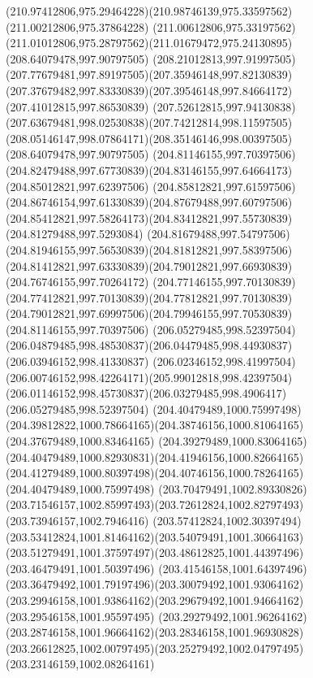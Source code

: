 {{  \curveto(210.97412806,975.29464228)(210.98746139,975.33597562)(211.00212806,975.37864228)
  \curveto(211.00612806,975.33197562)(211.01012806,975.28797562)(211.01679472,975.24130895)
  \moveto(208.64079478,997.90797505)
  \curveto(208.21012813,997.91997505)(207.77679481,997.89197505)(207.35946148,997.82130839)
  \curveto(207.37679482,997.83330839)(207.39546148,997.84664172)(207.41012815,997.86530839)
  \curveto(207.52612815,997.94130838)(207.63679481,998.02530838)(207.74212814,998.11597505)
  \curveto(208.05146147,998.07864171)(208.35146146,998.00397505)(208.64079478,997.90797505)
  \moveto(204.81146155,997.70397506)
  \curveto(204.82479488,997.67730839)(204.83146155,997.64664173)(204.85012821,997.62397506)
  \curveto(204.85812821,997.61597506)(204.86746154,997.61330839)(204.87679488,997.60797506)
  \curveto(204.85412821,997.58264173)(204.83412821,997.55730839)(204.81279488,997.5293084)
  \curveto(204.81679488,997.54797506)(204.81946155,997.56530839)(204.81812821,997.58397506)
  \curveto(204.81412821,997.63330839)(204.79012821,997.66930839)(204.76746155,997.70264172)
  \curveto(204.77146155,997.70130839)(204.77412821,997.70130839)(204.77812821,997.70130839)
  \curveto(204.79012821,997.69997506)(204.79946155,997.70530839)(204.81146155,997.70397506)
  \moveto(206.05279485,998.52397504)
  \curveto(206.04879485,998.48530837)(206.04479485,998.44930837)(206.03946152,998.41330837)
  \curveto(206.02346152,998.41997504)(206.00746152,998.42264171)(205.99012818,998.42397504)
  \curveto(206.01146152,998.45730837)(206.03279485,998.4906417)(206.05279485,998.52397504)
  \moveto(204.40479489,1000.75997498)
  \curveto(204.39812822,1000.78664165)(204.38746156,1000.81064165)(204.37679489,1000.83464165)
  \curveto(204.39279489,1000.83064165)(204.40479489,1000.82930831)(204.41946156,1000.82664165)
  \curveto(204.41279489,1000.80397498)(204.40746156,1000.78264165)(204.40479489,1000.75997498)
  \moveto(203.70479491,1002.89330826)
  \curveto(203.71546157,1002.85997493)(203.72612824,1002.82797493)(203.73946157,1002.7946416)
  \curveto(203.57412824,1002.30397494)(203.53412824,1001.81464162)(203.54079491,1001.30664163)
  \curveto(203.51279491,1001.37597497)(203.48612825,1001.44397496)(203.46479491,1001.50397496)
  \curveto(203.41546158,1001.64397496)(203.36479492,1001.79197496)(203.30079492,1001.93064162)
  \curveto(203.29946158,1001.93864162)(203.29679492,1001.94664162)(203.29546158,1001.95597495)
  \curveto(203.29279492,1001.96264162)(203.28746158,1001.96664162)(203.28346158,1001.96930828)
  \curveto(203.26612825,1002.00797495)(203.25279492,1002.04797495)(203.23146159,1002.08264161)
}}
